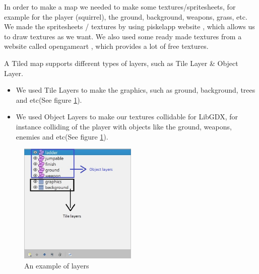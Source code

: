 \documentclass[12p]{article}
\begin{document}
In order to make a map we needed to make some textures/spritesheets, for example for the player (squirrel), the ground, background, weapons, grass, etc. We made the spritesheets / textures by using piskelapp website \cite{piskelapp}, which allows us to draw textures as we want. We also used some ready made textures from a website called opengameart \cite{opengameart}, which provides a lot of free textures.

A Tiled map supports different types of layers, such as Tile Layer \& Object Layer. 
\begin{itemize}
\item We used Tile Layers to make the graphics, such as ground, background, trees and etc(See figure \ref{fig:ExampleOfMapLayers}).
\item We used Object Layers to make our textures collidable for LibGDX, for instance colliding of the player with objects like the ground, weapons, enemies and etc(See figure \ref{fig:ExampleOfMapLayers}).
\end{itemize}

\begin{figure}[ht]
  \centering
  \includegraphics[width=0.5\textwidth]{Documentation/layers}
  \caption{An example of layers}
  \label{fig:ExampleOfMapLayers}
\end{figure}

\paragraph{}
\paragraph{}
\paragraph{}
\paragraph{}
\end{document}
